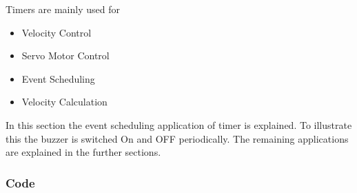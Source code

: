 \documentclass[a4paper,12pt,oneside]{article}
\begin{document}
			Timers are mainly used for
			\begin{itemize}
				\item Velocity Control
				\item Servo Motor Control
				\item Event Scheduling
				\item Velocity Calculation
			\end{itemize}
			
			In this section the event scheduling application of timer is explained. To illustrate this the buzzer is switched On and OFF periodically. The remaining applications are explained in the further sections. \\
			\subsubsection{\textbf{Code}}
\end{document}
